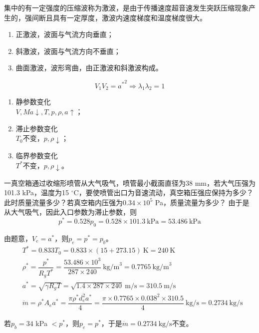 
\begin{definition}[激波]
	集中的有一定强度的压缩波称为激波，是由于传播速度超音速发生突跃压缩现象产生的，强间断且具有一定厚度，激波内速度梯度和温度梯度很大。
\end{definition}


\begin{enumerate}
	\item 正激波，波面与气流方向垂直；
	\item 斜激波，波面与气流方向不垂直；
	\item 曲面激波，波形弯曲，由正激波和斜激波构成。
\end{enumerate}


\begin{equation*}
	V_1 V_2 = {a^{*}}^2 \Rightarrow \lambda_1 \lambda_2 = 1
\end{equation*}

\begin{enumerate}
	\item 静参数变化\\
	$V, Ma \downarrow, T, p, \rho, a \uparrow$；
	\item 滞止参数变化\\
	$T_0$不变，$p, \rho \downarrow$；
	\item 临界参数变化\\
	$T^{*}$不变，$p, \rho \downarrow$。
\end{enumerate}


\begin{example}
	一真空箱通过收缩形喷管从大气吸气，喷管最小截面直径为38 mm，若大气压强为101.3 kPa，温度为15 $^{\circ}$C，要使喷管出口为音速流动，真空箱压强应保持为多少？此时质量流量多少？若真空箱内压强为$0.34 \times 10^5$ Pa，质量流量为多少？
	\vskip 0.3cm
	由于是从大气吸气，因此入口参数为滞止参数，则
	\begin{equation*}
		p^{*} = 0.528 p_0 = 0.528 \times 101.3 \mathrm{~kPa} = 53.486 \mathrm{~kPa}
	\end{equation*}

	由题意，$V_e = a^{*}$，则$p_e = p^{*} = p_b$。	
	\vskip -0.3cm
    \begin{align*}
    	&T^{*} = 0.833 T_0 = 0.833 \times (15 + 273.15) \mathrm{~K} = 240 \mathrm{~K}\\
    	&\rho^{*} = \dfrac{p^{*}}{R_g T^{*}} = \dfrac{53.486 \times 10^3}{287 \times 240} \mathrm{~kg/m}^3 = 0.7765 \mathrm{~kg/m}^3\\
		&a^{*} = \sqrt{\gamma R_g T} = \sqrt{1.4 \times 287 \times 240} \mathrm{~m/s} = 310.5 \mathrm{~m/s}\\
		&\dot{m} = \rho^{*} A_e a^{*} = \dfrac{\pi \rho^{*} d_e^2 a^{*}}{4} = \dfrac{\pi \times 0.7765 \times 0.038^2 \times 310.5}{4} \mathrm{~kg/s} = 0.2734 \mathrm{~kg/s}
	\end{align*}

	若$p_b = 34$ kPa $< p^{*}$，则$p_e = p^{*}$，于是$\dot{m} = 0.2734 \mathrm{~kg/s}$不变。
\end{example}

